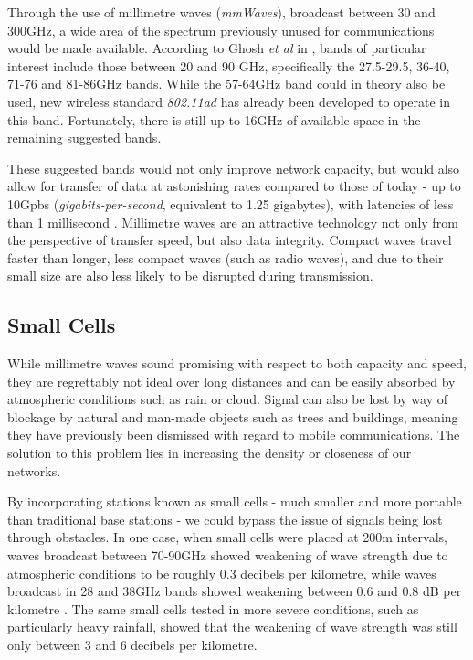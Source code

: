 \documentclass[journal]{IEEEtran}
\begin{document}
Through the use of millimetre waves (\textit{mmWaves}), broadcast between 30 and 300GHz, a wide area of the spectrum previously unused for communications would be made available. According to Ghosh \textit{et al} in \cite{mmwave}, bands of particular interest include those between 20 and 90 GHz, specifically the 27.5-29.5, 36-40, 71-76 and 81-86GHz bands. While the 57-64GHz band could in theory also be used, new wireless standard \textit{802.11ad} has already been developed to operate in this band. Fortunately, there is still up to 16GHz of available space in the remaining suggested bands. 

These suggested bands would not only improve network capacity, but would also allow for transfer of data at astonishing rates compared to those of today - up to 10Gpbs (\textit{gigabits-per-second}, equivalent to 1.25 gigabytes), with latencies of less than 1 millisecond \cite{mmwave}. Millimetre waves are an attractive technology not only from the perspective of transfer speed, but also data integrity. Compact waves travel faster than longer, less compact waves (such as radio waves), and due to their small size are also less likely to be disrupted during transmission. 

\subsection{Small Cells}

While millimetre waves sound promising with respect to both capacity and speed, they are regrettably not ideal over long distances and can be easily absorbed by atmospheric conditions such as rain or cloud. Signal can also be lost by way of blockage by natural and man-made objects such as trees and buildings, meaning they have previously been dismissed with regard to mobile communications. The solution to this problem lies in increasing the density or closeness of our networks. 

By incorporating stations known as small cells - much smaller and more portable than traditional base stations - we could bypass the issue of signals being lost through obstacles. In one case, when small cells were placed at 200m intervals, waves broadcast between 70-90GHz showed weakening of wave strength due to atmospheric conditions to be roughly 0.3 decibels per kilometre, while waves broadcast in 28 and 38GHz bands showed weakening between 0.6 and 0.8 dB per kilometre \cite{mmwave}. The same small cells tested in more severe conditions, such as particularly heavy rainfall, showed that the weakening of wave strength was still only between 3 and 6 decibels per kilometre. 
\end{document}
